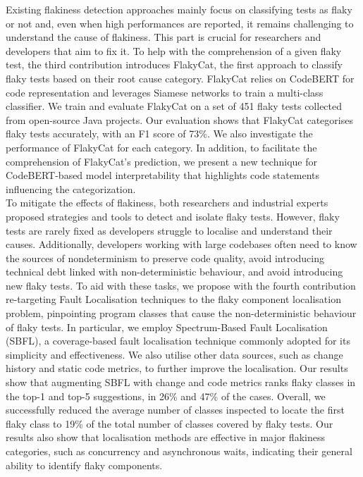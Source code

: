  Existing flakiness detection approaches mainly focus on classifying tests as flaky or not and, even when high performances are reported, it remains challenging to understand the cause of flakiness. This part is crucial for researchers and developers that aim to fix it. To help with the comprehension of a given flaky test, the third contribution introduces FlakyCat, the first approach to classify flaky tests based on their root cause category. FlakyCat relies on CodeBERT for code representation and leverages Siamese networks to train a multi-class classifier. We train and evaluate FlakyCat on a set of 451 flaky tests collected from open-source Java projects. Our evaluation shows that FlakyCat categorises flaky tests accurately, with an F1 score of 73\%. We also investigate the performance of FlakyCat for each category. In addition, to facilitate the comprehension of FlakyCat's prediction, we present a new technique for CodeBERT-based model interpretability that highlights code statements influencing the categorization.\\
    
 To mitigate the effects of flakiness, both researchers and industrial experts proposed strategies and tools to detect and isolate flaky tests. However, flaky tests are rarely fixed as developers struggle to localise and understand their causes. Additionally, developers working with large codebases often need to know the sources of nondeterminism to preserve code quality, \ie avoid introducing technical debt linked with non-deterministic behaviour, and avoid introducing new flaky tests. To aid with these tasks, we propose with the fourth contribution re-targeting Fault Localisation techniques to the flaky component localisation problem, \ie pinpointing program classes that cause the non-deterministic behaviour of flaky tests. In particular, we employ Spectrum-Based Fault Localisation (SBFL), a coverage-based fault localisation technique commonly adopted for its simplicity and effectiveness. We also utilise other data sources, such as change history and static code metrics, to further improve the localisation. Our results show that augmenting SBFL with change and code metrics ranks flaky classes in the top-1 and top-5 suggestions, in 26\% and 47\% of the cases. Overall, we successfully reduced the average number of classes inspected to locate the first flaky class to 19\% of the total number of classes covered by flaky tests. Our results also show that localisation methods are effective in major flakiness categories, such as concurrency and asynchronous waits, indicating their general ability to identify flaky components.\\
    
